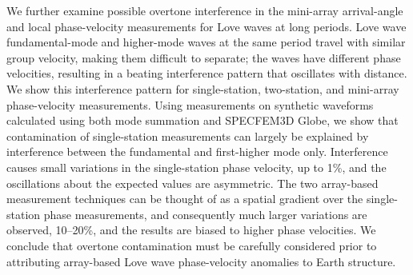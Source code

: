\documentclass[12pt,oneside]{book}
\begin{document}
We further examine possible overtone interference in the mini-array arrival-angle and local phase-velocity measurements for Love waves at long periods. Love wave fundamental-mode and higher-mode waves at the same period travel with similar group velocity, making them difficult to separate; the waves have different phase velocities, resulting in a beating interference pattern that oscillates with distance. We show this interference pattern for single-station, two-station, and mini-array phase-velocity measurements. Using measurements on synthetic waveforms calculated using both mode summation and SPECFEM3D Globe, we show that contamination of single-station measurements can largely be explained by interference between the fundamental and first-higher mode only. Interference causes small variations in the single-station phase velocity, up to 1\%, and the oscillations about the expected values are asymmetric. The two array-based measurement techniques can be thought of as a spatial gradient over the single-station phase measurements, and consequently much larger variations are observed, 10--20\%, and the results are biased to higher phase velocities. We conclude that overtone contamination must be carefully considered prior to attributing array-based Love wave phase-velocity anomalies to Earth structure.  

\raggedbottom
\pagebreak

\frontmatter

\pagestyle{fancy}
\chead{}
\lhead{}
\rhead{}
\cfoot{\thepage}
\renewcommand{\headrulewidth}{0pt}

\tableofcontents
{}
\raggedbottom
\pagebreak

\listoffigures
{}
\raggedbottom
\pagebreak

\listoftables
{}
\raggedbottom
\pagebreak
\end{document}
